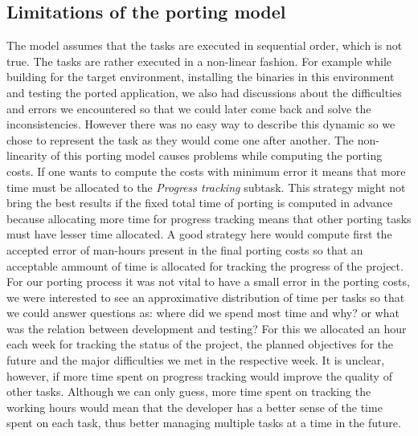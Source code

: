 \subsection{Limitations of the porting model}

The model assumes that the tasks are executed in
sequential order, which is not true. The tasks are rather executed in a
non-linear fashion. For example while building for the target environment,
installing the binaries in this environment and testing the ported application,
we also had discussions about the difficulties and errors we encountered so that
we could later come back and solve the inconsistencies. However there was no
easy way to describe this dynamic so we chose to represent the task as they
would come one after another. The non-linearity of this porting model causes
problems while computing the porting costs. If one wants to compute the costs
with minimum error it means that more time must be allocated to the
\textit{Progress tracking} subtask. This strategy might not bring the best
results if the fixed total time of porting is computed in advance because
allocating more time for progress tracking means that other porting tasks must
have lesser time allocated. A good strategy here would compute first the
accepted error of man-hours present in the final porting costs so that an
acceptable ammount of time is allocated for tracking the progress of the
project. For our porting process it was not vital to have a small error in the
porting costs, we were interested to see an approximative distribution of time
per tasks so that we could answer questions as: where did we spend most time and
why? or what was the relation between development and testing? For this we
allocated an hour each week for tracking the status of the project, the planned
objectives for the future and the major difficulties we met in the respective
week. It is unclear, however, if more time spent on progress tracking would
improve the quality of other tasks. Although we can only guess, more time spent on
tracking the working hours would mean that the developer has a better sense of
the time spent on each task, thus better managing multiple tasks at a time in
the future.

